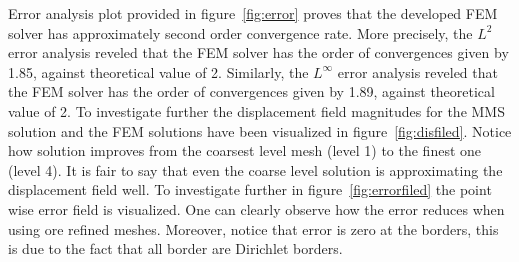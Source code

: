 \documentclass{report}
\begin{document}
Error analysis plot provided in figure~\ref{fig:error} proves that the developed FEM solver has approximately second order convergence rate. More precisely, the $L^2$ error analysis reveled that the FEM solver has the order of  convergences given by 1.85, against theoretical value of 2. Similarly,  the $L^\infty$ error analysis reveled that the FEM solver has the order of  convergences given by 1.89, against theoretical value of 2.  To investigate further the displacement  field magnitudes for the MMS solution and the FEM solutions have been visualized in figure~\ref{fig:disfiled}. Notice how solution improves from the coarsest level mesh (level 1) to the finest one (level 4). It is fair to say that even the coarse level solution is approximating the displacement field well. To investigate further in figure~\ref{fig:errorfiled} the point wise error field is visualized. One can clearly  observe how the error reduces when using ore refined meshes. Moreover, notice that error is zero at the borders, this is due to the fact that all border are Dirichlet borders.  
\end{document}

